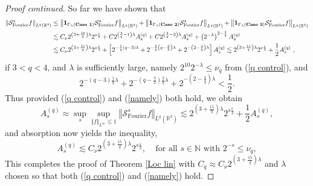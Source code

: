\documentclass{amsart}%
\theoremstyle{plain}
\numberwithin{equation}{section}
\begin{document}
\begin{proof}
[Proof continued]So far we have shown that
\begin{align*}
\left\Vert \mathcal{S}_{\operatorname*{Fourier}}^{s}f\right\Vert
_{L^{q}\left(  \mathbb{R}^{3}\right)  }  &  \leq\left\Vert \mathbf{1}%
_{\Gamma_{\lambda}\left(  \text{\textbf{Case 1}}\right)  }\mathcal{S}%
_{\operatorname*{Fourier}}^{s}f\right\Vert _{L^{q}\left(  \mathbb{R}%
^{3}\right)  }+\left\Vert \mathbf{1}_{\Gamma_{\lambda}\left(
\text{\textbf{Case 2}}\right)  }\mathcal{S}_{\operatorname*{Fourier}}%
^{s}f\right\Vert _{L^{q}\left(  \mathbb{R}^{3}\right)  }+\left\Vert
\mathbf{1}_{\Gamma_{\lambda}\left(  \text{\textbf{Case 3}}\right)
}\mathcal{S}_{\operatorname*{Fourier}}^{s}f\right\Vert _{L^{q}\left(
\mathbb{R}^{3}\right)  }\\
&  \lesssim C_{\nu}2^{\left(  3+\frac{15}{q}\right)  \lambda}2^{s\frac
{\varepsilon}{3}}+C2^{\left(  \frac{3}{q}-1\right)  \lambda}A_{s}^{\left(
q\right)  }+C2^{\left(  \frac{3}{q}-2\right)  \lambda}A_{s}^{\left(  q\right)
}+\left(  2^{-\lambda}\right)  ^{2-\frac{4}{q}}A_{s}^{\left(  q\right)  }\\
&  \lesssim C_{\nu}2^{\left(  3+\frac{15}{q}\right)  \lambda}2^{s\frac
{\varepsilon}{3}}+\left[  2^{-\frac{1}{q}\left(  q-3\right)  \lambda
}+2^{-\frac{2}{q}\left(  q-\frac{3}{2}\right)  \lambda}+2^{-\left(  2-\frac
{4}{q}\right)  \lambda}\right]  A_{s}^{\left(  q\right)  }\lesssim2^{\left(
3+\frac{15}{q}\right)  \lambda}2^{s\frac{\varepsilon}{3}}+\frac{1}{2}%
A_{s}^{\left(  q\right)  }\ ,
\end{align*}
if $3<q<4$, and $\lambda$ is sufficiently large, namely $2^{10}2^{-\lambda
}\leq\nu_{q}$ from (\ref{q control}), and%
\begin{equation}
2^{-\left(  q-3\right)  \frac{1}{q}\lambda}+2^{-\left(  q-\frac{3}{2}\right)
\frac{2}{q}\lambda}+2^{-\left(  2-\frac{4}{q}\right)  \lambda}<\frac{1}{2}.
\label{namely}%
\end{equation}
Thus provided (\ref{q control}) and (\ref{namely}) both hold, we obtain%
\[
A_{s}^{\left(  q\right)  }\approx\sup_{s}\sup_{\left\Vert f\right\Vert
_{L^{\infty}}\leq1}\left\Vert \mathcal{S}_{\operatorname*{Fourier}}%
^{s}f\right\Vert _{L^{q}\left(  \mathbb{R}^{3}\right)  }\lesssim2^{\left(
3+\frac{15}{q}\right)  \lambda}2^{s\frac{\varepsilon}{3}}+\frac{1}{2}%
A_{s}^{\left(  q\right)  },
\]
and absorption now yields the inequality,%
\[
A_{s}^{\left(  q\right)  }\lesssim C_{\nu}2^{\left(  3+\frac{15}{q}\right)
\lambda}2^{s\frac{\varepsilon}{3}},\ \ \ \ \ \text{for all }s\in
\mathbb{N}\text{ with }2^{-s}\leq\nu_{q},
\]
This completes the proof of Theorem \ref{Loc lin} with $C_{q}\approx C_{\nu
}2^{\left(  3+\frac{15}{q}\right)  \lambda}$ and $\lambda$ chosen so that both
(\ref{q control}) and (\ref{namely}) hold.
\end{proof}
\end{document}

